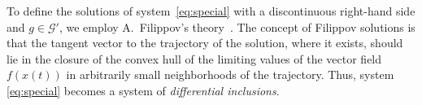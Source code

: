 \documentclass[journal]{IEEEtran}
\begin{document}
%


To define the solutions of system~\eqref{eq:special} with 
a discontinuous right-hand side and $g\in\mathcal{G'}$,
we employ A.~Filippov's theory~\cite{p2}.
The concept of Filippov solutions is that the tangent vector
to the trajectory of the solution, where it exists, should lie
in the closure of the convex hull of the limiting values
of the vector field $f(x(t))$ in arbitrarily small neighborhoods of the trajectory. 
Thus, system \eqref{eq:special} becomes a system of \emph{differential inclusions}.
\end{document}
